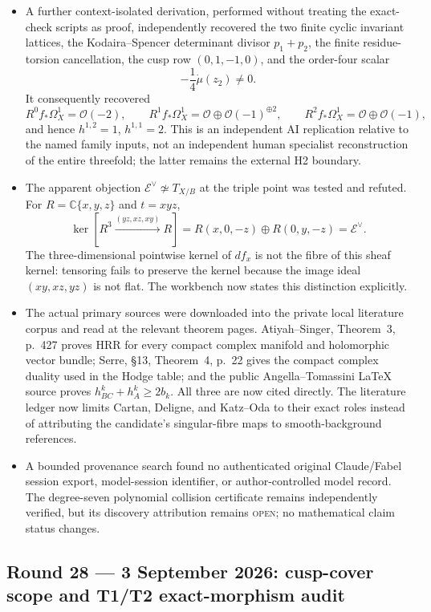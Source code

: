 \begin{itemize}[leftmargin=1.8em]
\item A further context-isolated derivation, performed without treating the
exact-check scripts as proof, independently recovered the two finite cyclic
invariant lattices, the Kodaira--Spencer determinant divisor
$p_1+p_2$, the finite residue-torsion cancellation, the cusp row
$(0,1,-1,0)$, and the order-four scalar
\[
 -\frac14\dot\mu(z_2)\ne0.
\]
It consequently recovered
\[
 R^0f_*\Omega_X^1=\mathcal O(-2),\qquad
 R^1f_*\Omega_X^1=\mathcal O\oplus\mathcal O(-1)^{\oplus2},\qquad
 R^2f_*\Omega_X^1=\mathcal O\oplus\mathcal O(-1),
\]
and hence $h^{1,2}=1$, $h^{1,1}=2$.  This is an independent AI
replication relative to the named family inputs, not an independent human
specialist reconstruction of the entire threefold; the latter remains the
external H2 boundary.
\item The apparent objection $\mathcal E^\vee\not\simeq T_{X/B}$ at the
triple point was tested and refuted.  For
$R=\mathbb C\{x,y,z\}$ and $t=xyz$,
\[
 \ker\!\left[R^3\xrightarrow{(yz,xz,xy)}R\right]
 =R(x,0,-z)\oplus R(0,y,-z)=\mathcal E^\vee.
\]
The three-dimensional pointwise kernel of $df_x$ is not the fibre of this
sheaf kernel: tensoring fails to preserve the kernel because the image ideal
$(xy,xz,yz)$ is not flat.  The workbench now states this distinction
explicitly.
\item The actual primary sources were downloaded into the private local
literature corpus and read at the relevant theorem pages.  Atiyah--Singer,
Theorem~3, p.~427 proves HRR for every compact complex manifold and
holomorphic vector bundle; Serre, \S13, Theorem~4, p.~22 gives the compact
complex duality used in the Hodge table; and the public Angella--Tomassini
LaTeX source proves $h^k_{BC}+h^k_A\ge2b_k$.  All three are now cited
directly.  The literature ledger now limits Cartan, Deligne, and Katz--Oda
to their exact roles instead of attributing the candidate's singular-fibre
maps to smooth-background references.
\item A bounded provenance search found no authenticated original
Claude/Fabel session export, model-session identifier, or author-controlled
model record.  The degree-seven polynomial collision certificate remains
independently verified, but its discovery attribution remains
\textsc{open}; no mathematical claim status changes.
\end{itemize}

\subsection*{Round 28 --- 3 September 2026: cusp-cover scope and T1/T2 exact-morphism audit}

